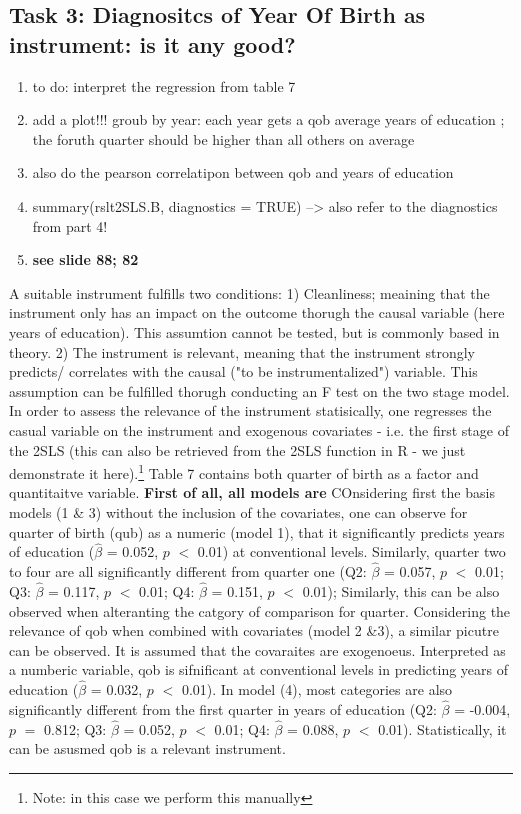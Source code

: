 \documentclass[a4paper]{article}
\begin{document}
\subsection{Task 3: Diagnositcs of Year Of Birth as instrument: is it any good?}

\begin{enumerate}
   \item to do: interpret the regression from table 7
   \item add a plot!!! groub by year: each year gets a qob average years of education ; the foruth quarter should be higher than all others on average
   \item also do the pearson correlatipon between qob and years of education
   \item summary(rslt2SLS.B, diagnostics = TRUE) --> also refer to the diagnostics from part 4!
   \item \textbf{see slide 88; 82}
\end{enumerate}


A suitable instrument fulfills two conditions: 1) Cleanliness; meaining that the instrument only has an impact on the outcome thorugh the causal variable (here years of education). This assumtion cannot be tested, but is commonly based in theory.
2) The instrument is relevant, meaning that the instrument strongly predicts/ correlates with the causal ("to be instrumentalized") variable. This assumption can be fulfilled thorugh conducting an F test on the two stage model. 
In order to assess the relevance of the instrument statisically, one regresses the casual variable on the instrument and exogenous covariates - i.e. the first stage of the 2SLS (this can also be retrieved from the 2SLS function in R - we just demonstrate it here).\footnote{Note: in this case we perform this manually} Table 7 contains both quarter of birth as a factor and quantitaitve variable. 
\textbf{First of all, all models are }
COnsidering first the basis models (1 \& 3) without the inclusion of the covariates, one can observe for quarter of birth (qub) as a numeric (model 1), that it significantly predicts years of education ($\hat{\beta}$ = 0.052, $p$ $<$ 0.01) at conventional levels. Similarly, quarter two to four are all significantly different from quarter one (Q2: $\hat{\beta}$ = 0.057, $p$ $<$ 0.01; Q3: $\hat{\beta}$ = 0.117, $p$ $<$ 0.01; Q4: $\hat{\beta}$ = 0.151, $p$ $<$ 0.01); Similarly, this can be also  observed when alteranting the catgory of comparison for quarter. 
Considering the relevance of qob when combined with covariates (model 2 \&3), a similar picutre can be observed. It is assumed that the covaraites are exogenoeus. Interpreted as a numberic variable, qob is sifnificant at conventional levels in predicting years of education ($\hat{\beta}$ = 0.032, $p$ $<$ 0.01). In model (4), most categories are also significantly different from the first quarter in years of education (Q2: $\hat{\beta}$ = -0.004, $p$ $=$ 0.812; Q3: $\hat{\beta}$ = 0.052, $p$ $<$ 0.01; Q4: $\hat{\beta}$ = 0.088, $p$ $<$ 0.01). Statistically, it can be asusmed qob is a relevant instrument. 
\end{document}
